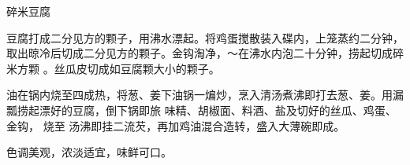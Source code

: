 \begin{recipe}{碎米豆腐}

\ingredients


\cooking

\step 豆腐打成二分见方的颗子，用沸水漂起。将鸡蛋搅散装入碟内，上笼蒸约二分钟，
取出晾冷后切成二分见方的颗子。金钩淘净，〜在沸水内泡二十分钟，捞起切成碎米方颗
。丝瓜皮切成如豆腐颗大小的颗子。

\step 油在锅内烧至四成热，将葱、姜下油锅一煸炒，烹入清汤煮沸即打去葱、姜。用漏
瓢捞起漂好的豆腐，倒下锅即旅 味精、胡椒面、料酒、盐及切好的丝瓜、鸡蛋、金钩，
烧至 汤沸即挂二流芡，再加鸡油混合造转，盛入大薄碗即成。

\notes

色调美观，浓淡适宜，味鲜可口。

\end{recipe}

